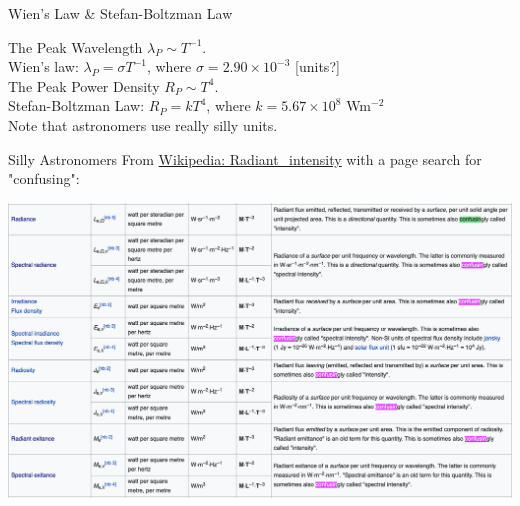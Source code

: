 \begin{frame}{Wien's Law \& Stefan-Boltzman Law}

\small
The Peak Wavelength $\lambda_{P} \sim T^{-1}$. \\[1ex]

Wien's law: $\lambda_{P} = \sigma T^{-1}$, where $\sigma = 2.90 \times 10^{-3}$ [units?] \\[8ex]

The Peak Power Density $R_{P} \sim T^{4}$.\\[1ex]
Stefan-Boltzman Law: $R_{P} = k T^{4}$, where $k = 5.67 \times 10^8 $ Wm$^{-2}$\\[8ex]

Note that astronomers use really silly units.

\end{frame}

\begin{frame}{Silly Astronomers}
\small
From \href{https://en.wikipedia.org/wiki/Radiant_intensity}{Wikipedia: Radiant\_intensity} with a page search for "confusing":

\includegraphics[scale=0.25]{astrotards}

\end{frame}

